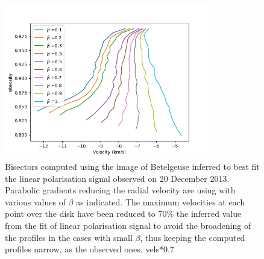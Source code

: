 \documentclass{/Users/art2/TeX/aanda/aa}
\begin{document}
\begin{figure}
   \includegraphics[width=0.8\textwidth]{Bisectors_cual1.png}

   \caption{Bisectors computed using the image of Betelgeuse inferred to best fit the linear polarisation signal observed on 20 December 2013. Parabolic 
   gradients reducing the radial velocity are using with various values of $\beta$ as indicated. The maximum velocities at each point over the disk
   have been reduced to 70\%  the inferred value from the fit of linear polarisation signal to avoid the broadening of the profiles in the cases with 
   small $\beta$, thus keeping the computed profiles narrow, as the observed ones. 
    vels*0.7}
   \label{bisector1}
   \end{figure}
\end{document}
